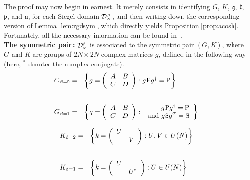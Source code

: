 \documentclass[draftclsnofoot]{IEEEtran}
\begin{document}
The proof may now begin in earnest. It merely consists in identifying $G$, $K$, $\mathfrak{g}$, $\mathfrak{k}$, $\mathfrak{p}$, and $\mathfrak{a}$, for each Siegel domain $\mathcal{D}^{\hspace{0.02cm}\scriptscriptstyle \beta}_{\scriptscriptstyle N}\hspace{0.03cm}$, and then writing down the corresponding version of Lemma \ref{lem:rgdsym}, which directly yields Proposition \ref{prop:acosh}. Fortunately, all the necessary information can be found in~\cite{piatetski}\cite{helgason}. \\[0.1cm]
\textbf{The symmetric pair\,:} $\mathcal{D}^{\hspace{0.02cm}\scriptscriptstyle \beta}_{\scriptscriptstyle N}$ is associated to the symmetric pair $(G,K)$, where $G$ and $K$ are groups of $2N \times 2N$ complex matrices $g$, defined in the following way (here, $^*$ denotes the complex conjugate). 
$$
\begin{array}{rl}
G_{\beta = 2} = & \left\lbrace g = \left(\begin{array}{cc} A & B \\ C & D\end{array}\right): g\hspace{0.02cm}\mathrm{P}g^\dagger = \mathrm{P} \right\rbrace \\[1cm]
G_{\beta = 1} = & \left\lbrace g = \left(\begin{array}{cc} A & B \\ C & D\end{array}\right): \begin{array}{r} g\hspace{0.02cm}\mathrm{P}g^\dagger = \mathrm{P} \\ \text{ and } g\hspace{0.02cm} \mathrm{S}g^T = \mathrm{S}\end{array}\right\rbrace
\end{array}
$$

$$
\begin{array}{rl}
K_{\beta = 2} = & \left\lbrace k = \left(\begin{array}{cc} U & \\ & V \end{array}\right):U\hspace{0.02cm},V \in U(N) \right\rbrace
 \\[1cm]
K_{\beta = 1} = & \left\lbrace k = \left(\begin{array}{cc} U & \\ & U^* \end{array}\right):U\in U(N) \right\rbrace 
\end{array}
$$
\vspace{0.2cm}
\end{document}

